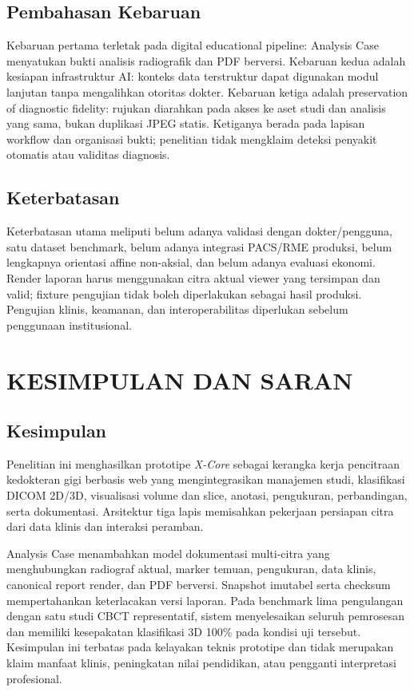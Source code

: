 \documentclass[12pt,a4paper,oneside]{report}
\newcommand{\xcore}{\textit{X-Core}}
\begin{document}
\section{Pembahasan Kebaruan}
Kebaruan pertama terletak pada digital educational pipeline: Analysis Case menyatukan bukti analisis radiografik dan PDF berversi. Kebaruan kedua adalah kesiapan infrastruktur AI: konteks data terstruktur dapat digunakan modul lanjutan tanpa mengalihkan otoritas dokter. Kebaruan ketiga adalah preservation of diagnostic fidelity: rujukan diarahkan pada akses ke aset studi dan analisis yang sama, bukan duplikasi JPEG statis. Ketiganya berada pada lapisan workflow dan organisasi bukti; penelitian tidak mengklaim deteksi penyakit otomatis atau validitas diagnosis.

\section{Keterbatasan}
Keterbatasan utama meliputi belum adanya validasi dengan dokter/pengguna, satu dataset benchmark, belum adanya integrasi PACS/RME produksi, belum lengkapnya orientasi affine non-aksial, dan belum adanya evaluasi ekonomi. Render laporan harus menggunakan citra aktual viewer yang tersimpan dan valid; fixture pengujian tidak boleh diperlakukan sebagai hasil produksi. Pengujian klinis, keamanan, dan interoperabilitas diperlukan sebelum penggunaan institusional.

\chapter{KESIMPULAN DAN SARAN}
\label{bab:kesimpulan-lengkap}
\section{Kesimpulan}
Penelitian ini menghasilkan prototipe \xcore{} sebagai kerangka kerja pencitraan kedokteran gigi berbasis web yang mengintegrasikan manajemen studi, klasifikasi DICOM 2D/3D, visualisasi volume dan slice, anotasi, pengukuran, perbandingan, serta dokumentasi. Arsitektur tiga lapis memisahkan pekerjaan persiapan citra dari data klinis dan interaksi peramban.

Analysis Case menambahkan model dokumentasi multi-citra yang menghubungkan radiograf aktual, marker temuan, pengukuran, data klinis, canonical report render, dan PDF berversi. Snapshot imutabel serta checksum mempertahankan keterlacakan versi laporan. Pada benchmark lima pengulangan dengan satu studi CBCT representatif, sistem menyelesaikan seluruh pemrosesan dan memiliki kesepakatan klasifikasi 3D 100\% pada kondisi uji tersebut. Kesimpulan ini terbatas pada kelayakan teknis prototipe dan tidak merupakan klaim manfaat klinis, peningkatan nilai pendidikan, atau pengganti interpretasi profesional.
\end{document}
